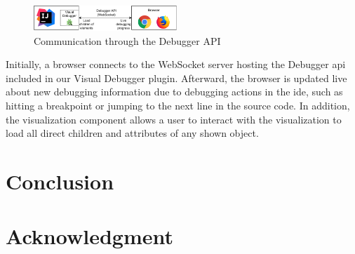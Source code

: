 \documentclass[conference]{IEEEtran}
\begin{document}
\begin{figure}[h]
    \centering
    \includegraphics[width=0.48\textwidth]{images/architecture.pdf}
    \caption{Communication through the Debugger API}
    \label{fig:api}
\end{figure}

Initially, a browser connects to the WebSocket server hosting the Debugger \gls*{api} included in our Visual Debugger plugin.
Afterward, the browser is updated live about new debugging information due to debugging actions in the \gls*{ide}, such as hitting a breakpoint or jumping to the next line in the source code.
In addition, the visualization component allows a user to interact with the visualization to load all direct children and attributes of any shown object.

\section{Conclusion}

\section*{Acknowledgment}



\end{document}

